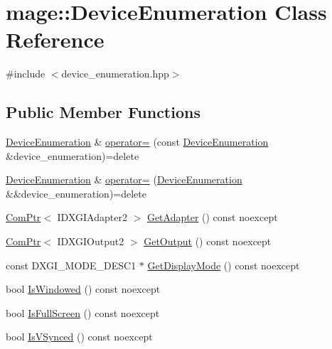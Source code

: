 \hypertarget{classmage_1_1_device_enumeration}{}\section{mage\+:\+:Device\+Enumeration Class Reference}
\label{classmage_1_1_device_enumeration}


{\ttfamily \#include $<$device\+\_\+enumeration.\+hpp$>$}

\subsection*{Public Member Functions}
\begin{DoxyCompactItemize}
\item 
\hyperlink{classmage_1_1_device_enumeration}{Device\+Enumeration} \& \hyperlink{classmage_1_1_device_enumeration_a03e3affa2b8bb4837cffda7b11389bea}{operator=} (const \hyperlink{classmage_1_1_device_enumeration}{Device\+Enumeration} \&device\+\_\+enumeration)=delete
\item 
\hyperlink{classmage_1_1_device_enumeration}{Device\+Enumeration} \& \hyperlink{classmage_1_1_device_enumeration_accf36804bfe510cc8a4d8495854596d6}{operator=} (\hyperlink{classmage_1_1_device_enumeration}{Device\+Enumeration} \&\&device\+\_\+enumeration)=delete
\item 
\hyperlink{namespacemage_ae74f374780900893caa5555d1031fd79}{Com\+Ptr}$<$ I\+D\+X\+G\+I\+Adapter2 $>$ \hyperlink{classmage_1_1_device_enumeration_ac7b5e28561c607aa02b521a81164715c}{Get\+Adapter} () const noexcept
\item 
\hyperlink{namespacemage_ae74f374780900893caa5555d1031fd79}{Com\+Ptr}$<$ I\+D\+X\+G\+I\+Output2 $>$ \hyperlink{classmage_1_1_device_enumeration_a8b3e0b888a0ae7caf1e340d456424416}{Get\+Output} () const noexcept
\item 
const D\+X\+G\+I\+\_\+\+M\+O\+D\+E\+\_\+\+D\+E\+S\+C1 $\ast$ \hyperlink{classmage_1_1_device_enumeration_aa7a073568788fa4fb3d90c2869527e78}{Get\+Display\+Mode} () const noexcept
\item 
bool \hyperlink{classmage_1_1_device_enumeration_a7a7d0c5a27309421209b5d89cd9dfd43}{Is\+Windowed} () const noexcept
\item 
bool \hyperlink{classmage_1_1_device_enumeration_a08fc72e65a9dbb218312502409c3ef57}{Is\+Full\+Screen} () const noexcept
\item 
bool \hyperlink{classmage_1_1_device_enumeration_a0eb995592a2bb3fbf33c2fff10123b03}{Is\+V\+Synced} () const noexcept
\end{DoxyCompactItemize}

